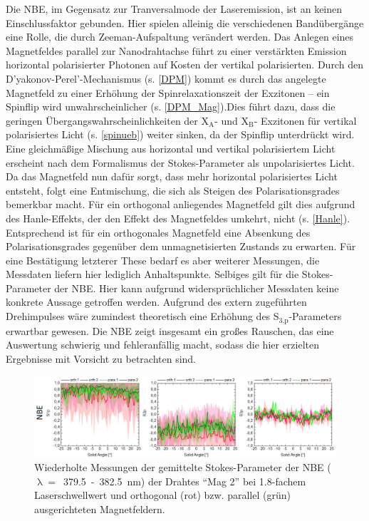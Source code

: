 Die NBE, im Gegensatz zur Tranversalmode der Laseremission, ist an keinen Einschlussfaktor gebunden. Hier spielen alleinig die verschiedenen Bandübergänge eine Rolle, die durch Zeeman-Aufspaltung verändert werden. Das Anlegen eines Magnetfeldes parallel zur Nanodrahtachse führt zu einer verstärkten Emission horizontal polarisierter Photonen auf Kosten der vertikal polarisierten. Durch den D'yakonov-Perel'-Mechanismus (s. \autoref{DPM}) kommt es durch das angelegte Magnetfeld zu einer Erhöhung der Spinrelaxationszeit der Exzitonen – ein Spinflip wird unwahrscheinlicher (s. \autoref{DPM_Mag}).\FloatBarrier \noindent Dies führt dazu, dass die geringen Übergangswahrscheinlichkeiten der X$_\text{A}$- und X$_\text{B}$- Exzitonen für vertikal polarisiertes Licht (s. \autoref{spinueb}) weiter sinken, da der Spinflip unterdrückt wird. Eine gleichmäßige Mischung aus horizontal und vertikal polarisiertem Licht erscheint nach dem Formalismus der Stokes-Parameter als unpolarisiertes Licht. Da das Magnetfeld nun dafür sorgt, dass mehr horizontal polarisiertes Licht entsteht, folgt eine Entmischung, die sich als Steigen des Polarisationsgrades bemerkbar macht. Für ein orthogonal anliegendes Magnetfeld gilt dies aufgrund des Hanle-Effekts, der den Effekt des Magnetfeldes umkehrt, nicht (s. \autoref{Hanle}). Entsprechend ist für ein orthogonales Magnetfeld eine Absenkung des Polarisationsgrades gegenüber dem unmagnetisierten Zustands zu erwarten. Für eine Bestätigung letzterer These bedarf es aber weiterer Messungen, die Messdaten liefern hier lediglich Anhaltspunkte. Selbiges gilt für die Stokes-Parameter der NBE. Hier kann aufgrund widersprüchlicher Messdaten keine konkrete Aussage getroffen werden. Aufgrund des extern zugeführten Drehimpulses wäre zumindest theoretisch eine Erhöhung des S$_\text{3,p}$-Parameters erwartbar gewesen. Die NBE zeigt insgesamt ein großes Rauschen, das eine Auswertung schwierig und fehleranfällig macht, sodass die hier erzielten Ergebnisse mit Vorsicht zu betrachten sind.
\begin{figure}[h]
\centering
\includegraphics[width=1\textwidth]{Bilder/Mag/Stokes_NBE_repeat}
\caption{Wiederholte Messungen der gemittelte Stokes-Parameter der NBE  (\mbox{$\uplambda=$ 379.5 - 382.5 nm}) der Drahtes ``Mag 2'' bei 1.8-fachem Laserschwellwert und orthogonal (rot) bzw. parallel (grün) ausgerichteten Magnetfeldern.}
\label{Stokes_NBE_repeat}
\end{figure}
